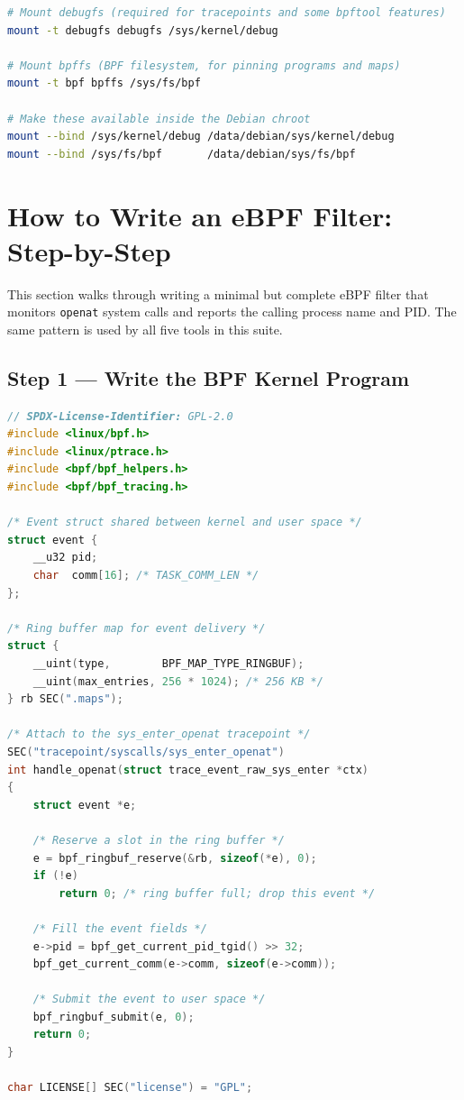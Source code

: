 \documentclass{mnitjaipur}
\begin{document}
\begin{lstlisting}[language=bash]
# Mount debugfs (required for tracepoints and some bpftool features)
mount -t debugfs debugfs /sys/kernel/debug

# Mount bpffs (BPF filesystem, for pinning programs and maps)
mount -t bpf bpffs /sys/fs/bpf

# Make these available inside the Debian chroot
mount --bind /sys/kernel/debug /data/debian/sys/kernel/debug
mount --bind /sys/fs/bpf       /data/debian/sys/fs/bpf
\end{lstlisting}

\section{How to Write an eBPF Filter: Step-by-Step}

This section walks through writing a minimal but complete eBPF filter that monitors \texttt{openat} system calls and reports the calling process name and PID. The same pattern is used by all five tools in this suite.

\subsection{Step 1 --- Write the BPF Kernel Program}

\begin{lstlisting}[language=C,caption={Minimal eBPF filter: monitor openat syscalls (filter.bpf.c)}]
// SPDX-License-Identifier: GPL-2.0
#include <linux/bpf.h>
#include <linux/ptrace.h>
#include <bpf/bpf_helpers.h>
#include <bpf/bpf_tracing.h>

/* Event struct shared between kernel and user space */
struct event {
    __u32 pid;
    char  comm[16]; /* TASK_COMM_LEN */
};

/* Ring buffer map for event delivery */
struct {
    __uint(type,        BPF_MAP_TYPE_RINGBUF);
    __uint(max_entries, 256 * 1024); /* 256 KB */
} rb SEC(".maps");

/* Attach to the sys_enter_openat tracepoint */
SEC("tracepoint/syscalls/sys_enter_openat")
int handle_openat(struct trace_event_raw_sys_enter *ctx)
{
    struct event *e;

    /* Reserve a slot in the ring buffer */
    e = bpf_ringbuf_reserve(&rb, sizeof(*e), 0);
    if (!e)
        return 0; /* ring buffer full; drop this event */

    /* Fill the event fields */
    e->pid = bpf_get_current_pid_tgid() >> 32;
    bpf_get_current_comm(e->comm, sizeof(e->comm));

    /* Submit the event to user space */
    bpf_ringbuf_submit(e, 0);
    return 0;
}

char LICENSE[] SEC("license") = "GPL";
\end{lstlisting}
\end{document}
